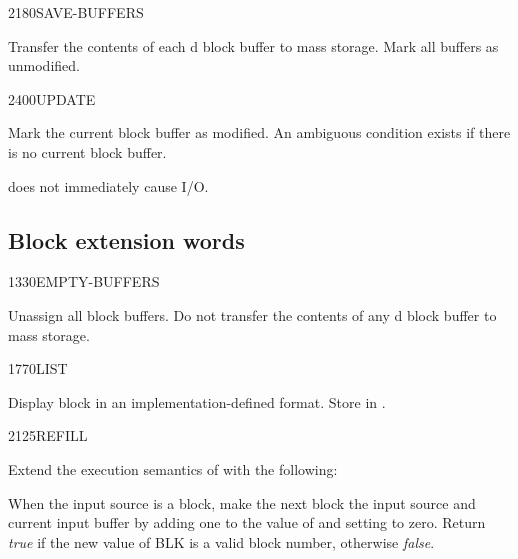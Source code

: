 \begin{worddef}{2180}{SAVE-BUFFERS}
\item \stack{}{}

	Transfer the contents of each d block buffer to
	mass storage. Mark all buffers as unmodified.
\end{worddef}

\newpage\vspace*{-6ex}
\begin{worddef}{2400}{UPDATE}
\item \stack{}{}

	Mark the current block buffer as modified. An ambiguous
	condition exists if there is no current block buffer.

	 does not immediately cause I/O.

\end{worddef}


\subsection{Block extension words} %
\extended

\begin{worddef}{1330}{EMPTY-BUFFERS}
\item \stack{}{}

	Unassign all block buffers. Do not transfer the contents of
	any d block buffer to mass storage.

\end{worddef}

\begin{worddef}{1770}{LIST}
\item {}

	Display block  in an implementation-defined format.
	Store  in .

\end{worddef}

\begin{worddef}{2125}{REFILL}
\item {}

	Extend the execution semantics of 
	with the following:

	When the input source is a block, make the next block the input
	source and current input buffer by adding one to the value of
	 and setting  to zero. Return
	\emph{true} if the new value of BLK is a valid block number,
	otherwise \emph{false}.

\end{worddef}

